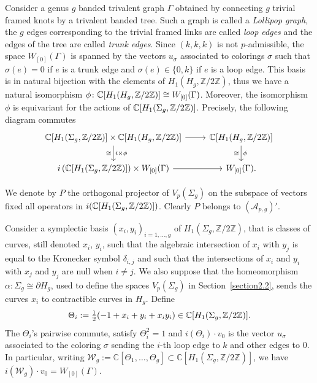 \documentclass[pdftex]{sigma}
\numberwithin{equation}{section}
\begin{document}
Consider a genus $g$ banded trivalent graph $\Gamma$ obtained by connecting $g$ trivial framed knots by a trivalent banded tree. Such a graph is called a \textit{Lollipop graph}, the $g$ edges corresponding to the trivial framed links are called \textit{loop edges} and the edges of the tree are called \textit{trunk edges}. Since $(k,k,k)$ is not $p$-admissible, the space $W_{[0]}(\Gamma)$ is spanned by the vectors $u_{\sigma}$ associated to colorings $\sigma$ such that $\sigma(e)=0$ if $e$ is a trunk edge and $\sigma(e)\in \{0,k \}$ if $e$ is a loop edge. This basis is in natural bijection with the elements of $H_1(H_g, \mathbb{Z}/2\mathbb{Z})$, thus we have a natural isomorphism $\phi\colon \mathbb{C} [ H_1(H_g, \mathbb{Z}/2\mathbb{Z}) ] \cong W_{[0]}(\Gamma)$. Moreover, the isomorphism $\phi$ is equivariant for the actions of $\mathbb{C} [ H_1(\Sigma_g, \mathbb{Z}/2\mathbb{Z})]$. Precisely, the following diagram commutes
\begin{equation*} \begin{tikzcd}
\mathbb{C}[H_1(\Sigma_g, \mathbb{Z}/2\mathbb{Z})]\times \mathbb{C}[H_1(H_g, \mathbb{Z}/2\mathbb{Z})]
\arrow[r," "] \arrow[d, "i\times \phi", "\cong"']
& \mathbb{C}[H_1(H_g, \mathbb{Z}/2\mathbb{Z})]
\arrow[d, "\phi","\cong"']
\\ i\left(\mathbb{C}[H_1(\Sigma_g, \mathbb{Z}/2\mathbb{Z})]\right)\times W_{[0]}(\Gamma)
\arrow[r, " "]
& W_{[0]}(\Gamma).
\end{tikzcd}\end{equation*}

We denote by $P$ the orthogonal projector of $V_p(\Sigma_g)$ on the subspace of vectors fixed all operators in $i (\mathbb{C} [ H_1(\Sigma_g, \mathbb{Z}/2\mathbb{Z})] )$. Clearly $P$ belongs to $(\mathcal{A}_{p,g})'$.

Consider a symplectic basis $(x_i,y_i)_{i=1, \ldots, g}$ of $H_1(\Sigma_g, \mathbb{Z}/2\mathbb{Z})$, that is classes of curves, still denoted $x_i$, $y_i$, such that the algebraic intersection of $x_i$ with $y_j$ is equal to the Kronecker symbol $\delta_{i,j}$ and such that the intersections of $x_i$ and $y_i$ with $x_j$ and $y_j$ are null when $i\neq j$. We also suppose that the homeomorphism $\alpha\colon \Sigma_g\cong \partial H_g$, used to define the spaces $V_p(\Sigma_g)$ in Section~\ref{section2.2}, sends the curves $x_i$ to contractible curves in $H_g$. Define
\begin{gather*}\Theta_i := \tfrac{1}{2} ( -1 + x_i + y_i +x_i y_i ) \in \mathbb{C} [ H_1(\Sigma_g, \mathbb{Z}/2\mathbb{Z})]. \end{gather*}
The $\Theta_i$'s pairwise commute, satisfy $\Theta_i^2=1$ and $i(\Theta_i)\cdot v_0$ is the vector $u_{\sigma}$ associated to the coloring $\sigma$ sending the $i$-th loop edge to $k$ and other edges to $0$. In particular, writing $\mathcal{W}_g:= \mathbb{C}[\Theta_1, \ldots, \Theta_g]\subset \mathbb{C}[H_1(\Sigma_g,\mathbb{Z}/2\mathbb{Z})]$, we have $i(\mathcal{W}_g) \cdot v_0 = W_{[0]}(\Gamma)$.
\end{document}
